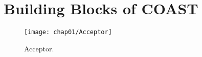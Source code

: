 \chapter{Building Blocks of COAST}\label{BuildingBlocks}

\begin{figure}[hbt]
  \centering
  \texttt{[image: chap01/Acceptor]}
  \caption{Acceptor.}
  \label{fig:zipstream}
\end{figure}



